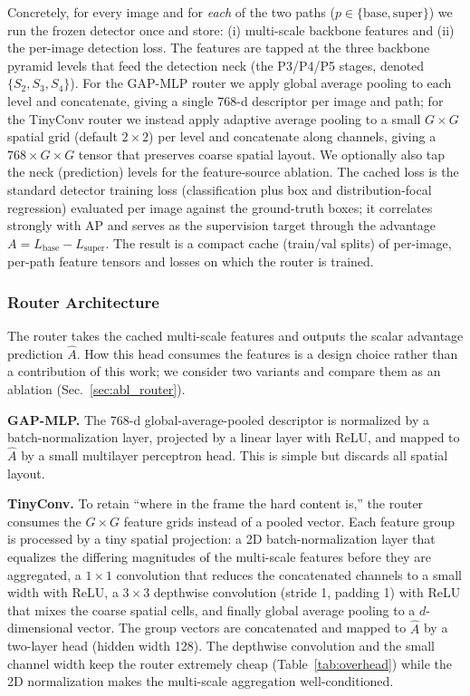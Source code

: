 Concretely, for every image and for \emph{each} of the two paths
($p \in \{\text{base},\text{super}\}$) we run the frozen detector once and
store: (i) multi-scale backbone features and (ii) the per-image detection loss.
The features are tapped at the three backbone pyramid levels that feed the
detection neck (the P3/P4/P5 stages, denoted $\{S_2, S_3, S_4\}$). For the GAP-MLP
router we apply global average pooling to each level and concatenate, giving a
single 768-d descriptor per image and path; for the TinyConv router we instead
apply adaptive average pooling to a small $G \times G$ spatial grid (default
$2 \times 2$) per level and concatenate along channels, giving a
$768 \times G \times G$ tensor that preserves coarse spatial layout. We optionally
also tap the neck (prediction) levels for the feature-source ablation. The cached
loss is the standard detector training loss (classification plus box and
distribution-focal regression) evaluated per image against the ground-truth boxes;
it correlates strongly with AP and serves as the supervision target through the
advantage $A = L_{\text{base}} - L_{\text{super}}$. The result is a compact
cache (train/val splits) of per-image, per-path feature tensors and losses on
which the router is trained.


\subsubsection{Router Architecture}
\label{sec:method_router}
The router takes the cached multi-scale features and outputs the scalar advantage
prediction $\hat{A}$. 
How this head consumes the features is a design choice
rather than a contribution of this work; we consider two variants and compare them
as an ablation (Sec.~\ref{sec:abl_router}).
 
\noindent\textbf{GAP-MLP.} The 768-d global-average-pooled descriptor is normalized
by a batch-normalization layer, projected by a linear layer with ReLU, and mapped
to $\hat{A}$ by a small multilayer perceptron head. This is simple but discards
all spatial layout.
 
\noindent\textbf{TinyConv.} To retain ``where in the frame the hard content is,''
the router consumes the $G \times G$ feature grids instead of a pooled vector. Each
feature group is processed by a tiny spatial projection: a 2D batch-normalization
layer that equalizes the differing magnitudes of the multi-scale features before
they are aggregated, a $1 \times 1$ convolution that reduces the concatenated
channels to a small width with ReLU, a $3 \times 3$ depthwise
convolution (stride 1, padding 1) with ReLU that mixes the coarse spatial cells,
and finally global average pooling to a $d$-dimensional vector. The group vectors
are concatenated and mapped to $\hat{A}$ by a two-layer head (hidden width 128).
The depthwise convolution and the small channel width keep the router extremely
cheap (Table~\ref{tab:overhead}) while the 2D normalization makes the multi-scale
aggregation well-conditioned.

